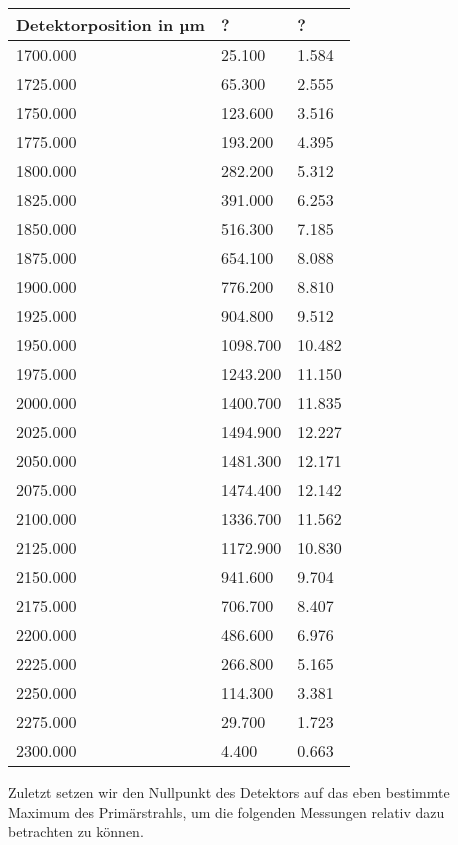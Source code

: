 \documentclass[bigchapter,colorback,accentcolor=tud4b,linedtoc,11pt]{tudreport}
\begin{document}
\begin{center}
  \begin{tabular}{|p{4cm}|p{4cm}|p{4cm}|}
    \hline
    Detektorposition in µm & ? & ?\\ \hline
    1700.000 & 25.100 & 1.584\\ \hline
    1725.000 & 65.300 & 2.555\\ \hline
    1750.000	 & 123.600 & 3.516\\ \hline
    1775.000	 & 193.200 & 4.395\\ \hline
    1800.000	 & 282.200 & 5.312\\ \hline
    1825.000	 & 391.000 & 6.253\\ \hline
    1850.000	 & 516.300 & 7.185\\ \hline
    1875.000	 & 654.100 & 8.088\\ \hline
    1900.000	 & 776.200 & 8.810\\ \hline
    1925.000	 & 904.800 & 9.512\\ \hline
    1950.000	 & 1098.700 & 10.482\\ \hline
    1975.000 & 1243.200 & 11.150\\ \hline
    2000.000 & 1400.700 & 11.835\\ \hline
    2025.000 & 1494.900 & 12.227\\ \hline
    2050.000	 & 1481.300 & 12.171\\ \hline
    2075.000 & 1474.400 & 12.142\\ \hline
    2100.000	 & 1336.700 & 11.562\\ \hline
    2125.000	 & 1172.900 & 10.830\\ \hline
    2150.000 & 941.600 & 9.704\\ \hline
    2175.000	 & 706.700 & 8.407\\ \hline
    2200.000	 & 486.600 & 6.976\\ \hline
    2225.000	 & 266.800 & 5.165\\ \hline
    2250.000	 & 114.300 & 3.381\\ \hline
    2275.000 & 29.700 & 	1.723\\ \hline
    2300.000 & 4.400	 & 0.663\\ \hline
	\end{tabular}
\end{center}

Zuletzt setzen wir den Nullpunkt des Detektors auf das eben bestimmte Maximum des Primärstrahls, um die folgenden Messungen relativ dazu betrachten zu können.
\end{document}
